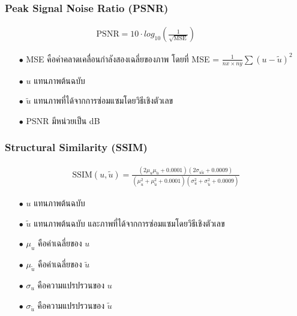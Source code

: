 \documentclass[xcolor=dvipsnames, xetex,serif]{beamer}
\numberwithin{equation}{section}
\begin{document}
		\begin{frame}
			\frametitle{Peak Signal Noise Ratio (PSNR)}
			\begin{align*}
			\text{PSNR}  = 10 \cdot log_{10} ( \frac{1}{\sqrt{\text{MSE}}} )  \hspace{1cm}
			\end{align*}
			\begin{itemize}
				\item[$\bullet$] MSE คือค่าคลาดเคลื่อนกำลังสองเฉลี่ยของภาพ โดยที่ MSE = $\frac{1}{nx \times ny} \sum (u - \tilde{u})^2 $
				\item[$\bullet$] $u$ แทนภาพต้นฉบับ
				\item[$\bullet$] $\tilde{u}$  แทนภาพที่ได้จากการซ่อมแซมโดยวิธีเชิงตัวเลข
				\item[$\bullet$] PSNR มีหน่วยเป็น dB
			\end{itemize}
		\end{frame}
		\begin{frame}
			\frametitle{Structural Similarity (SSIM)}
			\begin{align*}
			\text{SSIM}(u,\tilde{u}) = \frac{(2\mu_u\mu_{\tilde{u}} + 0.0001)(2\sigma_{u\tilde{u}} + 0.0009)}{(\mu_u^2+\mu_{\tilde{u}}^2+0.0001)(\sigma_u^2+\sigma_{\tilde{u}}^2+0.0009)}
			\end{align*}
			\begin{itemize}
				\item[$\bullet$] $u$ แทนภาพต้นฉบับ
				\item[$\bullet$] $\tilde{u}$  แทนภาพต้นฉบับ และภาพที่ได้จากการซ่อมแซมโดยวิธีเชิงตัวเลข
				\item[$\bullet$] $\mu_u$ คือค่าเฉลี่ยของ $u$
				\item[$\bullet$] $\mu_{\tilde{u}}$ คือค่าเฉลี่ยของ $\tilde{u}$
				\item[$\bullet$]  $\sigma_u$ คือความแปรปรวนของ $u$ 
				\item[$\bullet$] $\sigma_{\tilde{u}}$ คือความแปรปรวนของ $\tilde{u}$
			\end{itemize}
		\end{frame}
\end{document}
